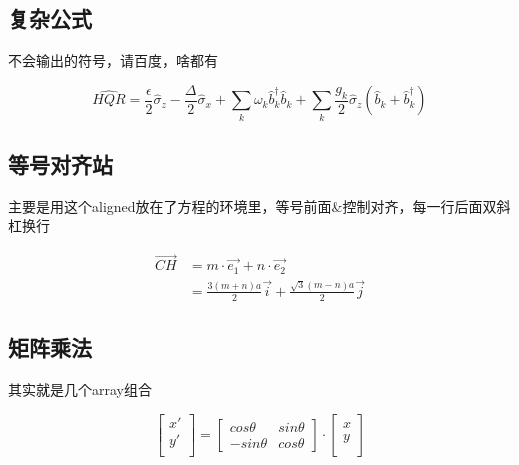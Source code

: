 \documentclass[AutoFakeBold]{LZUThesis}
\begin{document}

\subsection{复杂公式} %
\label{sub:复杂公式}
不会输出的符号，请百度，啥都有

\begin{equation}
\hat{HQR}=\frac{\epsilon}{2}\hat{\sigma}_{z}-\frac{\Delta}{2}\hat{\sigma}_{x}+\sum_{k}\omega_{k}\hat{b}_{k}^{\dagger}\hat{b}_{k}+\sum_{k}\frac{g_{k}}{2}\hat{\sigma}_{z}(\hat{b}_{k}+\hat{b}_{k}^{\dagger})\label{eq:sbm}
\end{equation}



\subsection{等号对齐站} %
\label{sub:等号对齐站}

主要是用这个aligned放在了方程的环境里，等号前面\&控制对齐，每一行后面双斜杠换行

\begin{equation}
    \begin{aligned}
        \vec{CH} & = m\cdot \vec{e_1} + n\cdot \vec{e_2} \\
        & = \frac{3(m+n)a}{2} \vec{i} + \frac{\sqrt{3}(m-n)a}{2} \vec{j} 
    \end{aligned}
    \label{ch}
\end{equation}


\subsection{矩阵乘法} %
\label{sub:矩阵乘法}

其实就是几个array组合

\begin{equation}
    \left[ 
    \begin{array}{c}
    x'\\
    y'\\
    \end{array}
    \right]=
    \left[ 
    \begin{array}{cc}
    cos \theta & sin \theta \\
    - sin \theta & cos \theta 
    \end{array}
    \right]
    \cdot
    \left[ 
    \begin{array}{c}
        x\\
        y\\
    \end{array}
    \right]
\end{equation}
\end{document}
